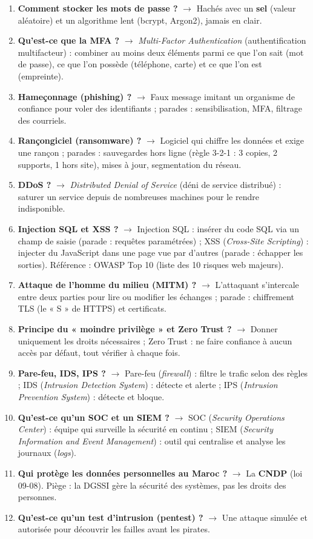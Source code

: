 \begin{enumerate}[leftmargin=*]
    \item \textbf{Comment stocker les mots de passe ?} $\rightarrow$ Hachés avec un \textbf{sel} (valeur aléatoire) et un algorithme lent (bcrypt, Argon2), jamais en clair.
    \item \textbf{Qu'est-ce que la MFA ?} $\rightarrow$ \textit{Multi-Factor Authentication} (authentification multifacteur) : combiner au moins deux éléments parmi ce que l'on sait (mot de passe), ce que l'on possède (téléphone, carte) et ce que l'on est (empreinte).
    \item \textbf{Hameçonnage (phishing) ?} $\rightarrow$ Faux message imitant un organisme de confiance pour voler des identifiants ; parades : sensibilisation, MFA, filtrage des courriels.
    \item \textbf{Rançongiciel (ransomware) ?} $\rightarrow$ Logiciel qui chiffre les données et exige une rançon ; parades : sauvegardes hors ligne (règle 3-2-1 : 3 copies, 2 supports, 1 hors site), mises à jour, segmentation du réseau.
    \item \textbf{DDoS ?} $\rightarrow$ \textit{Distributed Denial of Service} (déni de service distribué) : saturer un service depuis de nombreuses machines pour le rendre indisponible.
    \item \textbf{Injection SQL et XSS ?} $\rightarrow$ Injection SQL : insérer du code SQL via un champ de saisie (parade : requêtes paramétrées) ; XSS (\textit{Cross-Site Scripting}) : injecter du JavaScript dans une page vue par d'autres (parade : échapper les sorties). Référence : OWASP Top 10 (liste des 10 risques web majeurs).
    \item \textbf{Attaque de l'homme du milieu (MITM) ?} $\rightarrow$ L'attaquant s'intercale entre deux parties pour lire ou modifier les échanges ; parade : chiffrement TLS (le « S » de HTTPS) et certificats.
    \item \textbf{Principe du « moindre privilège » et Zero Trust ?} $\rightarrow$ Donner uniquement les droits nécessaires ; Zero Trust : ne faire confiance à aucun accès par défaut, tout vérifier à chaque fois.
    \item \textbf{Pare-feu, IDS, IPS ?} $\rightarrow$ Pare-feu (\textit{firewall}) : filtre le trafic selon des règles ; IDS (\textit{Intrusion Detection System}) : détecte et alerte ; IPS (\textit{Intrusion Prevention System}) : détecte et bloque.
    \item \textbf{Qu'est-ce qu'un SOC et un SIEM ?} $\rightarrow$ SOC (\textit{Security Operations Center}) : équipe qui surveille la sécurité en continu ; SIEM (\textit{Security Information and Event Management}) : outil qui centralise et analyse les journaux (\textit{logs}).
    \item \textbf{Qui protège les données personnelles au Maroc ?} $\rightarrow$ La \textbf{CNDP} (loi 09-08). Piège : la DGSSI gère la sécurité des systèmes, pas les droits des personnes.
    \item \textbf{Qu'est-ce qu'un test d'intrusion (pentest) ?} $\rightarrow$ Une attaque simulée et autorisée pour découvrir les failles avant les pirates.
\end{enumerate}

